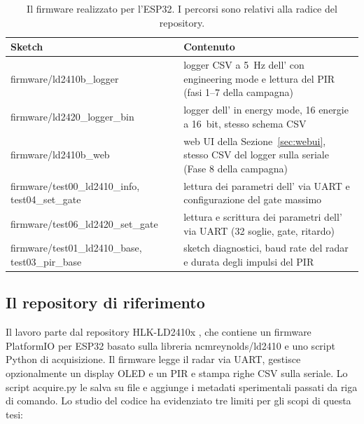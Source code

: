 \begin{table}[!htb]
\centering
\caption{Il firmware realizzato per l'ESP32. I percorsi sono relativi alla radice del repository.}
\label{tab:c3-14}
\small
\begin{tabularx}{\linewidth}{@{}>{\raggedright\arraybackslash}p{4.3cm}>{\raggedright\arraybackslash}X@{}}
\toprule
\textbf{Sketch} & \textbf{Contenuto} \\
\midrule
firmware/ld2410b\_\allowbreak{}logger & logger CSV a 5~Hz dell'\ldb{} con engineering mode e lettura del PIR (fasi 1--7 della campagna) \\
firmware/ld2420\_\allowbreak{}logger\_\allowbreak{}bin & logger dell'\ldc{} in energy mode, 16 energie a 16~bit, stesso schema CSV \\
firmware/ld2410b\_\allowbreak{}web & web UI della Sezione~\ref{sec:webui}, stesso CSV del logger sulla seriale (Fase 8 della campagna) \\
firmware/test00\_\allowbreak{}ld2410\_\allowbreak{}info,\allowbreak{} test04\_\allowbreak{}set\_\allowbreak{}gate & lettura dei parametri dell'\ldb{} via UART e configurazione del gate massimo \\
firmware/test06\_\allowbreak{}ld2420\_\allowbreak{}set\_\allowbreak{}gate & lettura e scrittura dei parametri dell'\ldc{} via UART (32 soglie, gate, ritardo) \\
firmware/test01\_\allowbreak{}ld2410\_\allowbreak{}base,\allowbreak{} test03\_\allowbreak{}pir\_\allowbreak{}base & sketch diagnostici, baud rate del radar e durata degli impulsi del PIR \\
\bottomrule
\end{tabularx}
\end{table}

\subsection{Il repository di riferimento}
\label{sec:c3-4-1}

Il lavoro parte dal repository HLK-LD2410x \cite{repoCallisto}, che contiene un firmware PlatformIO per ESP32 basato sulla libreria ncmreynolds/ld2410 e uno script Python di acquisizione. Il firmware legge il radar via UART, gestisce opzionalmente un display OLED e un PIR e stampa righe CSV sulla seriale. Lo script acquire.py le salva su file e aggiunge i metadati sperimentali passati da riga di comando. Lo studio del codice ha evidenziato tre limiti per gli scopi di questa tesi:

